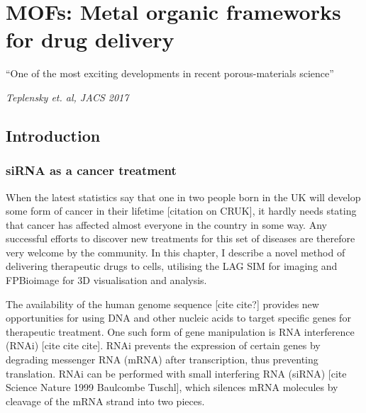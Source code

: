 \chapter{MOFs: Metal organic frameworks for drug delivery} \label{chap:MOF}


\ifpdf
    \graphicspath{{Chapter4/Figs/Raster/}{Chapter4/Figs/PDF/}{Chapter4/Figs/}}
\else
    \graphicspath{{Chapter4/Figs/Vector/}{Chapter4/Figs/}}
\fi

``One of the most exciting developments in recent porous-materials science''

\textit{Teplensky et. al, JACS 2017}~\cite{teplensky2017temperature}

\section{Introduction} \label{sec:MOF-intro}
\subsection{siRNA as a cancer treatment}
When the latest statistics say that one in two people born in the UK will develop some form of cancer in their lifetime [citation on CRUK], it hardly needs stating that cancer has affected almost everyone in the country in some way. 
Any successful efforts to discover new treatments for this set of diseases are therefore very welcome by the community. 
In this chapter, I describe a novel method of delivering therapeutic drugs to cells, utilising the LAG SIM for imaging and FPBioimage for 3D visualisation and analysis. 

The availability of the human genome sequence [cite cite?] provides new opportunities for using DNA and other nucleic acids to target specific genes for therapeutic treatment. 
One such form of gene manipulation is RNA interference (RNAi) [cite cite cite]. 
RNAi prevents the expression of certain genes by degrading messenger RNA (mRNA) after transcription, thus preventing translation. 
RNAi can be performed with small interfering RNA (siRNA) [cite Science Nature 1999 Baulcombe Tuschl], which silences mRNA molecules by cleavage of the mRNA strand into two pieces. 

